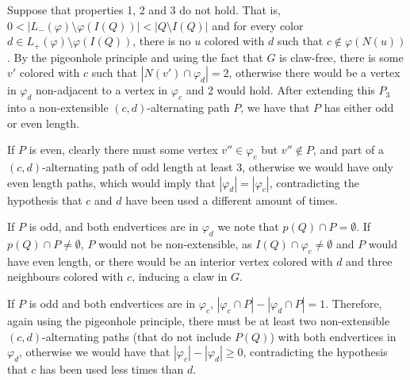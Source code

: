 \begin{tproof}
    Suppose that properties 1, 2 and 3 do not hold.
    That is,  $0 < |L_-(\varphi) \setminus \varphi(I(Q))| < |Q \setminus I(Q)|$ and for every color $d \in L_+(\varphi) \setminus \varphi(I(Q))$, there is no $u$ colored with $d$ such that $c \notin \varphi(N(u))$.
    By the pigeonhole principle and using the fact that $G$ is claw-free, there is some $v'$ colored with $c$ such that $\left|N(v') \cap \varphi_d\right| = 2$, otherwise there would be a vertex in $\varphi_d$ non-adjacent to a vertex in $\varphi_c$ and 2 would hold.
    After extending this $P_3$ into a non-extensible $(c,d)$-alternating path $P$, we have that $P$ has either odd or even length.
    
    If $P$ is even, clearly there must some vertex $v'' \in \varphi_c$ but $v'' \notin P$, and part of a $(c,d)$-alternating path of odd length at least 3, otherwise we would have only even length paths, which would imply that $|\varphi_d| = |\varphi_c|$, contradicting the hypothesis that $c$ and $d$ have been used a different amount of times.
    
    If $P$ is odd, and both endvertices are in $\varphi_d$ we note that $p(Q) \cap P = \emptyset$. If $p(Q) \cap P \neq \emptyset$, $P$ would not be non-extensible, as $I(Q) \cap \varphi_c \neq \emptyset$ and $P$ would have even length, or there would be an interior vertex colored with $d$ and three neighbours colored with $c$, inducing a claw in $G$.
    
    If $P$ is odd and both endvertices are in $\varphi_c$, $|\varphi_c \cap P| - |\varphi_d \cap P|  = 1$.
    Therefore, again using the pigeonhole principle, there must be at least two non-extensible $(c,d)$-alternating paths (that do not include $P(Q)$) with both endvertices in $\varphi_d$, otherwise we would have that $|\varphi_c| - |\varphi_d| \geq 0$, contradicting the hypothesis that $c$ has been used less times than $d$.
\end{tproof}

